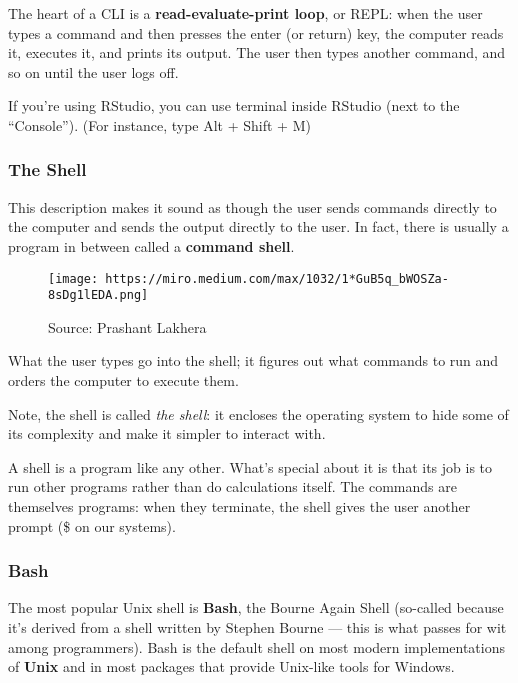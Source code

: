 \documentclass[
  letterpaper,
  DIV=11,
  numbers=noendperiod]{scrreprt}
\begin{document}
The heart of a CLI is a \textbf{read-evaluate-print loop}, or REPL: when
the user types a command and then presses the enter (or return) key, the
computer reads it, executes it, and prints its output. The user then
types another command, and so on until the user logs off.

If you're using RStudio, you can use terminal inside RStudio (next to
the ``Console''). (For instance, type Alt + Shift + M)

\hypertarget{the-shell}{%
\subsubsection*{The Shell}\label{the-shell}}

This description makes it sound as though the user sends commands
directly to the computer and sends the output directly to the user. In
fact, there is usually a program in between called a \textbf{command
shell}.

\begin{figure}

{\centering \texttt{[image: https://miro.medium.com/max/1032/1*GuB5q\_bWOSZa-8sDg1lEDA.png]}

}

\caption{Source: Prashant Lakhera}

\end{figure}

What the user types go into the shell; it figures out what commands to
run and orders the computer to execute them.

Note, the shell is called \emph{the shell}: it encloses the operating
system to hide some of its complexity and make it simpler to interact
with.

A shell is a program like any other. What's special about it is that its
job is to run other programs rather than do calculations itself. The
commands are themselves programs: when they terminate, the shell gives
the user another prompt (\$ on our systems).

\hypertarget{bash}{%
\subsubsection*{Bash}\label{bash}}

The most popular Unix shell is \textbf{Bash}, the Bourne Again Shell
(so-called because it's derived from a shell written by Stephen Bourne
--- this is what passes for wit among programmers). Bash is the default
shell on most modern implementations of \textbf{Unix} and in most
packages that provide Unix-like tools for Windows.
\end{document}
